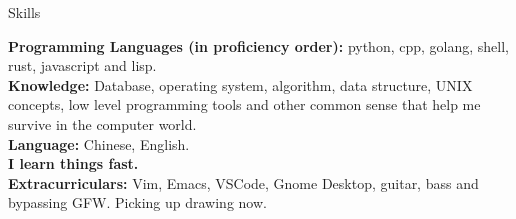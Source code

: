 \documentclass{resume} %
\begin{document}

\begin{rSection}{Skills}

{\bf Programming Languages (in proficiency order):} python, cpp, golang, shell, rust, javascript and lisp.
\\ {\bf Knowledge:} Database, operating system, algorithm, data structure, UNIX concepts, low level programming tools and other common sense that help me survive in the computer world.
\\ {\bf Language:} Chinese, English.
\\ {\bf I learn things fast.}
\\ {\bf Extracurriculars:} Vim, Emacs, VSCode, Gnome Desktop, guitar, bass and bypassing GFW. Picking up drawing now.

\end{rSection}
\end{document}

